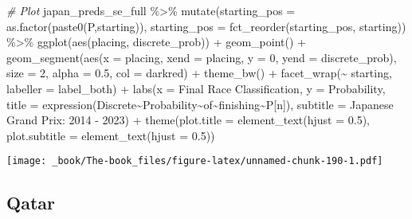\documentclass[
]{book}
\newenvironment{Shaded}{\begin{snugshade}}{\end{snugshade}}
\newcommand{\AttributeTok}[1]{\textcolor[rgb]{0.77,0.63,0.00}{#1}}
\newcommand{\CommentTok}[1]{\textcolor[rgb]{0.56,0.35,0.01}{\textit{#1}}}
\newcommand{\DecValTok}[1]{\textcolor[rgb]{0.00,0.00,0.81}{#1}}
\newcommand{\FloatTok}[1]{\textcolor[rgb]{0.00,0.00,0.81}{#1}}
\newcommand{\FunctionTok}[1]{\textcolor[rgb]{0.00,0.00,0.00}{#1}}
\newcommand{\NormalTok}[1]{#1}
\newcommand{\SpecialCharTok}[1]{\textcolor[rgb]{0.00,0.00,0.00}{#1}}
\newcommand{\StringTok}[1]{\textcolor[rgb]{0.31,0.60,0.02}{#1}}
\begin{document}
\begin{Shaded}
\begin{Highlighting}[]
\CommentTok{\# Plot}
\NormalTok{japan\_preds\_se\_full }\SpecialCharTok{\%\textgreater{}\%}
  \FunctionTok{mutate}\NormalTok{(}\AttributeTok{starting\_pos =} \FunctionTok{as.factor}\NormalTok{(}\FunctionTok{paste0}\NormalTok{(}\StringTok{\textquotesingle{}P\textquotesingle{}}\NormalTok{,starting)),}
         \AttributeTok{starting\_pos =} \FunctionTok{fct\_reorder}\NormalTok{(starting\_pos, starting)) }\SpecialCharTok{\%\textgreater{}\%}
  \FunctionTok{ggplot}\NormalTok{(}\FunctionTok{aes}\NormalTok{(placing, discrete\_prob)) }\SpecialCharTok{+}
  \FunctionTok{geom\_point}\NormalTok{() }\SpecialCharTok{+}
  \FunctionTok{geom\_segment}\NormalTok{(}\FunctionTok{aes}\NormalTok{(}\AttributeTok{x =}\NormalTok{ placing, }\AttributeTok{xend =}\NormalTok{ placing, }\AttributeTok{y =} \DecValTok{0}\NormalTok{, }\AttributeTok{yend =}\NormalTok{ discrete\_prob),}
               \AttributeTok{size =} \DecValTok{2}\NormalTok{, }\AttributeTok{alpha =} \FloatTok{0.5}\NormalTok{, }\AttributeTok{col =} \StringTok{\textquotesingle{}darkred\textquotesingle{}}\NormalTok{) }\SpecialCharTok{+}
  \FunctionTok{theme\_bw}\NormalTok{() }\SpecialCharTok{+}
  \FunctionTok{facet\_wrap}\NormalTok{(}\SpecialCharTok{\textasciitilde{}}\NormalTok{ starting, }\AttributeTok{labeller =}\NormalTok{ label\_both) }\SpecialCharTok{+}
  \FunctionTok{labs}\NormalTok{(}\AttributeTok{x =} \StringTok{\textquotesingle{}Final Race Classification\textquotesingle{}}\NormalTok{,}
       \AttributeTok{y =} \StringTok{\textquotesingle{}Probability\textquotesingle{}}\NormalTok{,}
       \AttributeTok{title =} \FunctionTok{expression}\NormalTok{(Discrete}\SpecialCharTok{\textasciitilde{}}\NormalTok{Probability}\SpecialCharTok{\textasciitilde{}}\NormalTok{of}\SpecialCharTok{\textasciitilde{}}\NormalTok{finishing}\SpecialCharTok{\textasciitilde{}}\NormalTok{P[n]),}
       \AttributeTok{subtitle =} \StringTok{\textquotesingle{}Japanese Grand Prix: 2014 {-} 2023\textquotesingle{}}\NormalTok{) }\SpecialCharTok{+}
  \FunctionTok{theme}\NormalTok{(}\AttributeTok{plot.title =} \FunctionTok{element\_text}\NormalTok{(}\AttributeTok{hjust =} \FloatTok{0.5}\NormalTok{),}
        \AttributeTok{plot.subtitle =} \FunctionTok{element\_text}\NormalTok{(}\AttributeTok{hjust =} \FloatTok{0.5}\NormalTok{)) }
\end{Highlighting}
\end{Shaded}

\texttt{[image: \_book/The-book\_files/figure-latex/unnamed-chunk-190-1.pdf]}

\hypertarget{qatar}{%
\subsection{Qatar}\label{qatar}}
\end{document}
